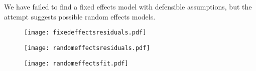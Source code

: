 \documentclass[12pt]{ecology}
\begin{document}
We have failed to find a fixed effects model with defensible assumptions, but the attempt suggests possible random effects models.  

\begin{figure}
\texttt{[image: fixedeffectsresiduals.pdf]}
\caption{}
\label{fig:fixedeffectsresiduals}
\end{figure}

\begin{figure}
\texttt{[image: randomeffectsresiduals.pdf]}
\caption{}
\label{fig:randomeffectsresiduals}
\end{figure}

\begin{figure}
\texttt{[image: randomeffectsfit.pdf]}
\caption{}
\label{fig:randomeffectsfit}
\end{figure}









\end{document}
